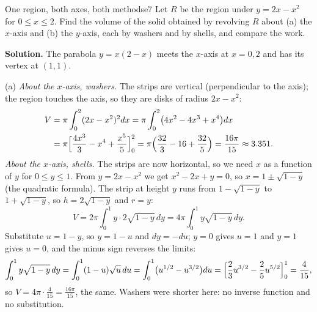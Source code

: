 \documentclass[11pt]{article}
\begin{document}
\begin{exmp}{One region, both axes, both methods}{e7}
Let $R$ be the region under $y=2x-x^2$ for $0\le x\le2$. Find the volume of the solid obtained by revolving $R$ about (a) the $x$-axis and (b) the $y$-axis, each by washers and by shells, and compare the work.

\textbf{Solution.} The parabola $y=x(2-x)$ meets the $x$-axis at $x=0,2$ and has its vertex at $(1,1)$.

(a) \emph{About the $x$-axis, washers.} The strips are vertical (perpendicular to the axis); the region touches the axis, so they are disks of radius $2x-x^2$:
\[
\begin{aligned}V&=\pi\int_0^2(2x-x^2)^2dx=\pi\int_0^2\bigl(4x^2-4x^3+x^4\bigr)dx\\ &=\pi\Bigl[\frac{4x^3}3-x^4+\frac{x^5}5\Bigr]_0^2=\pi\Bigl(\frac{32}3-16+\frac{32}5\Bigr)=\frac{16\pi}{15}\approx3.351 .
\end{aligned}
\]
\emph{About the $x$-axis, shells.} The strips are now horizontal, so we need $x$ as a function of $y$ for $0\le y\le1$. From $y=2x-x^2$ we get $x^2-2x+y=0$, so $x=1\pm\sqrt{1-y}$ (the quadratic formula). The strip at height $y$ runs from $1-\sqrt{1-y}$ to $1+\sqrt{1-y}$, so $h=2\sqrt{1-y}$ and $r=y$:
\[
V=2\pi\int_0^1y\cdot2\sqrt{1-y}\,dy=4\pi\int_0^1y\sqrt{1-y}\,dy .
\]
Substitute $u=1-y$, so $y=1-u$ and $dy=-du$; $y=0$ gives $u=1$ and $y=1$ gives $u=0$, and the minus sign reverses the limits:
\[
\int_0^1y\sqrt{1-y}\,dy=\int_0^1(1-u)\sqrt u\,du=\int_0^1\bigl(u^{1/2}-u^{3/2}\bigr)du=\Bigl[\frac23u^{3/2}-\frac25u^{5/2}\Bigr]_0^1=\frac4{15},
\]
so $V=4\pi\cdot\frac4{15}=\frac{16\pi}{15}$, the same. Washers were shorter here: no inverse function and no substitution.


\end{exmp}
\end{document}
